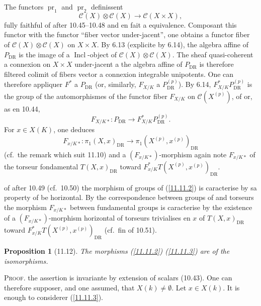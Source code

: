 \documentclass[12pt,a4paper]{article}
\theoremstyle{plain}
\newtheorem{proposition}[theorem]{Proposition}
\theoremstyle{definition}
\theoremstyle{remark}
\DeclareMathOperator{\pr}{pr}
\DeclareMathOperator{\Incl}{Incl}
\newcommand{\DR}{\mathrm{DR}}
\begin{document}
The functors $\pr_1$ and $\pr_2$ definissent
$$\mathcal{C}(X) \otimes \mathcal{C}(X) \longrightarrow \mathcal{C}(X \times X),$$
fully faithful of after 10.45--10.48 and en fait a equivalence. Composant this functor with the functor ``fiber vector under-jacent'', one obtains a functor fiber of $\mathcal{C}(X) \otimes \mathcal{C}(X)$ on $X \times X$. By 6.13 (explicite by 6.14), the algebra affine of $P_{\DR}$ is the image of a $\Incl$-object of $\mathcal{C}(X) \otimes \mathcal{C}(X)$. The sheaf quasi-coherent a connexion on $X \times X$ under-jacent a the algebra affine of $P_{\DR}$ is therefore filtered colimit of fibers vector a connexion integrable unipotents. One can therefore appliquer $F^*$ a $P_{\DR}$ (or, similarly, $F_{X/K}$ a $P_{\DR}^{(p)}$). By 6.14, $F_{X/K}^* P_{\DR}^{(p)}$ is the group of the automorphismes of the functor fiber $F_{X/K}$ on $\mathcal{C}(X^{(p)})$, of or, as en 10.44,
\begin{equation}\label{11.11.2}
F_{X/K *}: P_{\DR} \longrightarrow F_{X/K}^* P_{\DR}^{(p)}. \tag{11.11.2}
\end{equation}
For $x \in X(K)$, one deduces
\begin{equation}\label{11.11.3}
F_{x/K *}: \pi_1(X, x)_{\DR} \longrightarrow \pi_1(X^{(p)}, x^{(p)})_{\DR} \tag{11.11.3}
\end{equation}
(cf.~the remark which suit 11.10) and a $(F_{x/K *})$-morphism again note $F_{x/K *}$ of the torseur fondamental $T(X, x)_{\DR}$ toward $F_{x/K}^* T(X^{(p)}, x^{(p)})_{\DR}$.

of after 10.49 (cf.~10.50) the morphism of groups of (\ref{11.11.2}) is caracterise by sa property of be horizontal. By the correspondence between groups of and torseurs the morphism $F_{x/K *}$ between fundamental groups is caracterise by the existence of a $(F_{x/K *})$-morphism horizontal of torseurs trivialises en $x$ of $T(X, x)_{\DR}$ toward $F_{x/K}^* T(X^{(p)}, x^{(p)})_{\DR}$ (cf.~fin of 10.51).

\begin{proposition}[11.12]
The morphisms (\ref{11.11.2}) (\ref{11.11.3}) are of the isomorphisms.
\end{proposition}

\textsc{Proof.} the assertion is invariante by extension of scalars (10.43). One can therefore supposer, and one assumed, that $X(k) \neq \emptyset$. Let $x \in X(k)$. It is enough to considerer (\ref{11.11.3}).
\end{document}
